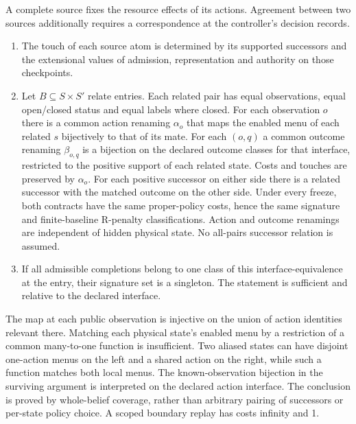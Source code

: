 \begin{theorem}\label{thm:t03}

A complete source fixes the resource effects of its actions. Agreement between two sources additionally requires a correspondence at the controller's decision records.

\begin{enumerate}
\def\labelenumi{\arabic{enumi}.}

\item
  The touch of each source atom is determined by its supported successors and the extensional values of admission, representation and authority on those checkpoints.
\item
  Let \(B\subseteq S\times S'\) relate entries. Each related pair has equal observations, equal open/closed status and equal labels where closed. For each observation \(o\) there is a common action renaming \(\alpha_o\) that maps the enabled menu of each related \(s\) bijectively to that of its mate. For each \((o,q)\) a common outcome renaming \(\beta_{o,q}\) is a bijection on the declared outcome classes for that interface, restricted to the positive support of each related state. Costs and touches are preserved by \(\alpha_o\). For each positive successor on either side there is a related successor with the matched outcome on the other side. Under every freeze, both contracts have the same proper-policy costs, hence the same signature and finite-baseline R-penalty classifications. Action and outcome renamings are independent of hidden physical state. No all-pairs successor relation is assumed.
\item
  If all admissible completions belong to one class of this interface-equivalence at the entry, their signature set is a singleton. The statement is sufficient and relative to the declared interface.
\end{enumerate}

The map at each public observation is injective on the union of action identities relevant there. Matching each physical state's enabled menu by a restriction of a common many-to-one function is insufficient. Two aliased states can have disjoint one-action menus on the left and a shared action on the right, while such a function matches both local menus. The known-observation bijection in the surviving argument is interpreted on the declared action interface. The conclusion is proved by whole-belief coverage, rather than arbitrary pairing of successors or per-state policy choice. A scoped boundary replay has costs infinity and 1.

\end{theorem}

